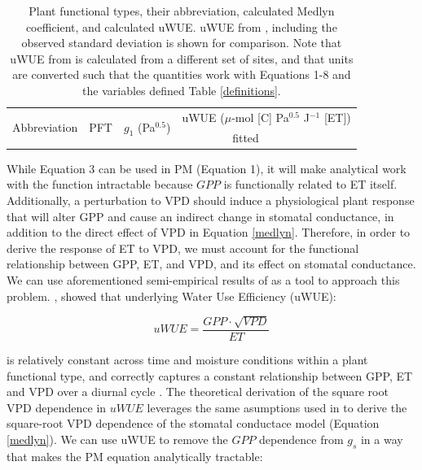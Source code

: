 \documentclass[draft,linenumbers]{agujournal}
\begin{document}
\begin{table}
  \caption{Plant functional types, their abbreviation, calculated
    Medlyn coefficient, and calculated uWUE. uWUE from
    \citet{Zhou_2015}, including the observed standard deviation is
    shown for comparison. Note that uWUE from \citet{Zhou_2015} is
    calculated from a different set of sites, and that units are
    converted such that the quantities work with Equations 1-8 and the
    variables defined Table \ref{definitions}.}
  \small
  \label{pft}
  \centering
  \begin{tabular}{l c c @{\qquad} c c}
    \hline
    \multirow{2}[3]{*}{Abbreviation} & \multirow{2}[3]{*}{PFT} & \multirow{2}[3]{*}{$g_1$ (Pa$^{0.5}$)} & \multicolumn{2}{c}{uWUE ($\mu$-mol [C] Pa$^{0.5}$ J$^{-1}$ [ET])}  \\
    \cmidrule{4-5}

                                     & & & fitted & \citet{Zhou_2015} \\

    \hline
    
    \hline
  \end{tabular}
\end{table}

While Equation 3 can be used in PM (Equation 1), it will make
analytical work with the function intractable because $GPP$ is
functionally related to ET itself. Additionally, a perturbation to VPD
should induce a physiological plant response that will alter GPP and
cause an indirect change in stomatal conductance, in addition to the
direct effect of VPD in Equation \ref{medlyn}. Therefore, in order to
derive the response of ET to VPD, we must account for the functional
relationship between GPP, ET, and VPD, and its effect on stomatal
conductance. We can use aforementioned semi-empirical results of
\citet{Zhou_2015} as a tool to approach this
problem. \citet{Zhou_2015}, showed that  underlying Water Use
Efficiency (uWUE):

\begin{linenomath*}
  \begin{equation}
    uWUE = \frac{GPP \cdot \sqrt{VPD}}{ET}
    \label{uwue}
  \end{equation}
\end{linenomath*}

is relatively constant across time and moisture conditions within a
plant functional type, and correctly captures a constant relationship
between GPP, ET and VPD over a diurnal cycle \citep{Zhou_2014}. The
theoretical derivation of the square root VPD dependence in $uWUE$
leverages the same asumptions used in \cite{MEDLYN_2011} to derive the
square-root VPD dependence of the stomatal conductace model (Equation
\ref{medlyn}).  We can use uWUE to remove the $GPP$ dependence from
$g_s$ in a way that makes the PM equation analytically tractable:
\end{document}
